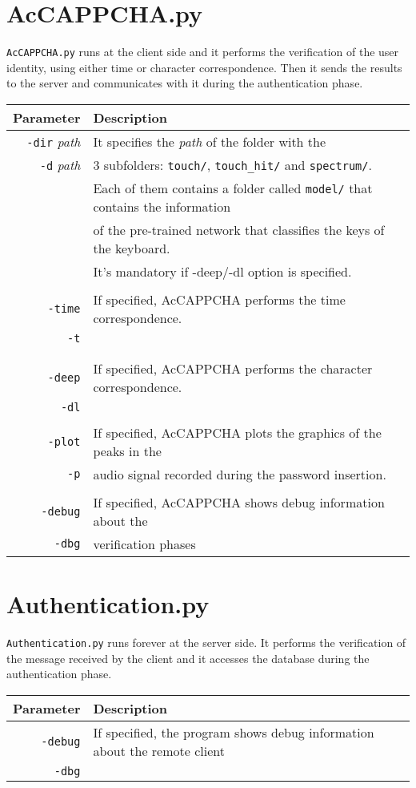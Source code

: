 \section{AcCAPPCHA.py}
\texttt{AcCAPPCHA.py} runs at the client side and it performs the verification of the user identity, using either time or character correspondence. Then it sends the results to the server and communicates with it during the authentication phase.

{\footnotesize
\begin{longtable}{rl}
\hline
\textbf{Parameter} & \textbf{Description}\\
\hline
\texttt{-dir} \textit{path} & It specifies the \textit{path} of the folder with the\\
\texttt{-d} \textit{path} & 3 subfolders: \texttt{touch/}, \texttt{touch\_hit/} and \texttt{spectrum/}.\\
& Each of them contains a folder called \texttt{model/} that contains the information\\
& of the pre-trained network that classifies the keys of the keyboard.\\
& It's mandatory if -deep/-dl option is specified.\\
&\\
\texttt{-time} & If specified, AcCAPPCHA performs the time correspondence.\\
\texttt{-t} & \\
&\\
&\\
\texttt{-deep} & If specified, AcCAPPCHA performs the character correspondence.\\
\texttt{-dl} & \\
&\\
\texttt{-plot} & If specified, AcCAPPCHA plots the graphics of the peaks in the\\
\texttt{-p} & audio signal recorded during the password insertion.\\
&\\
\texttt{-debug} & If specified, AcCAPPCHA shows debug information about the\\
\texttt{-dbg} & verification phases\\
\hline
\end{longtable}}

\section{Authentication.py}
\texttt{Authentication.py} runs forever at the server side. It performs the verification of the message received by the client and it accesses the database during the authentication phase.
\begin{table}[h]
\centering\footnotesize
\begin{tabular}{rl}
\hline
\textbf{Parameter} & \textbf{Description}\\
\hline
\texttt{-debug} & If specified, the program shows debug information about the remote client\\
\texttt{-dbg} &\\
\hline
\end{tabular}
\end{table}